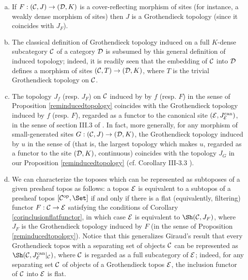 \documentclass[a4paper,12pt]{article}
\begin{document}
\begin{remarks}\label{rem1}
	\begin{enumerate}[(a)]
		\item If $F:({\cal C}, J)\to ({\cal D}, K)$ is a cover-reflecting morphism of sites (for instance, a weakly dense morphism of sites) then $J$ is a Grothendieck topology (since it coincides with $J_{F}$).
		
		\item The classical definition of Grothendieck topology induced on a full $K$-dense subcategory $\cal C$ of a category $\cal D$ is subsumed by this general definition of induced topology; indeed, it is readily seen that the embedding of $\cal C$ into $\cal D$ defines a morphism of sites $({\cal C}, T)\to ({\cal D}, K)$, where $T$ is the trivial Grothendieck topology on $\cal C$.
		
		\item The topology $J_{f}$ (resp. $J_{F}$) on $\cal C$ induced by  by $f$ (resp. $F$) in the sense of Proposition \ref{reminducedtopology} coincides with the Grothendieck topology induced by $f$ (resp. $F$), regarded as a functor to the canonical site $({\cal E}, J^{\textup{can}}_{\cal E})$, in the sense of section III.3 of \cite{grothendieck}. In fact, more generally, for any morphism of small-generated sites $G:({\cal C}, J)\to ({\cal D}, K)$, the Grothendieck topology induced by $u$ in the sense of  \cite{grothendieck} (that is, the largest topology which makes $u$, regarded as a functor to the site $({\cal D}, K)$, continuous) coincides with the topology $J_{G}$ in our Proposition \ref{reminducedtopology} (cf. Corollary III-3.3 \cite{grothendieck}).      
		
		\item We can characterize the toposes which can be represented as subtoposes of a given presheaf topos as follows: a topos $\cal E$ is equivalent to a subtopos of a presheaf topos $[{\cal C}^{\textup{op}}, \Set]$ if and only if there is a flat (equivalently, filtering) functor $F:{\cal C}\to {\cal E}$ satisfying the conditions of Corollary \ref{corinclusionflatfunctor}, in which case $\cal E$ is equivalent to $\Sh({\cal C}, J_{F})$, where $J_{F}$ is the Grothendieck topology induced by $F$ (in the sense of Proposition \ref{reminducedtopology}). Notice that this generalizes Giraud's result that every Grothendieck topos with a separating set of objects  $\cal C$  can be represented as $\Sh({\cal C}, J^{\textup{can}}_{\cal E}|_{\cal C})$, where $\cal C$ is regarded as a full subcategory of $\cal E$; indeed, for any separating set $\cal C$ of objects of a Grothendieck topos $\cal E$, the inclusion functor of $\cal C$ into $\cal E$ is flat.   
	\end{enumerate}
	
\end{remarks}
\end{document}

